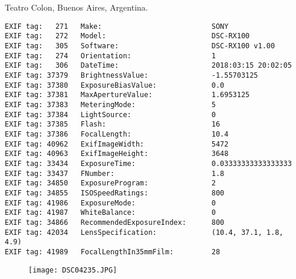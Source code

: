 \section{\protect{}}
\noindent Teatro Colon, Buenos Aires, Argentina.
\noindent
\begin{lstlisting}
EXIF tag:   271   Make:                          SONY
EXIF tag:   272   Model:                         DSC-RX100
EXIF tag:   305   Software:                      DSC-RX100 v1.00
EXIF tag:   274   Orientation:                   1
EXIF tag:   306   DateTime:                      2018:03:15 20:02:05
EXIF tag: 37379   BrightnessValue:               -1.55703125
EXIF tag: 37380   ExposureBiasValue:             0.0
EXIF tag: 37381   MaxApertureValue:              1.6953125
EXIF tag: 37383   MeteringMode:                  5
EXIF tag: 37384   LightSource:                   0
EXIF tag: 37385   Flash:                         16
EXIF tag: 37386   FocalLength:                   10.4
EXIF tag: 40962   ExifImageWidth:                5472
EXIF tag: 40963   ExifImageHeight:               3648
EXIF tag: 33434   ExposureTime:                  0.03333333333333333
EXIF tag: 33437   FNumber:                       1.8
EXIF tag: 34850   ExposureProgram:               2
EXIF tag: 34855   ISOSpeedRatings:               800
EXIF tag: 41986   ExposureMode:                  0
EXIF tag: 41987   WhiteBalance:                  0
EXIF tag: 34866   RecommendedExposureIndex:      800
EXIF tag: 42034   LensSpecification:             (10.4, 37.1, 1.8, 4.9)
EXIF tag: 41989   FocalLengthIn35mmFilm:         28

\end{lstlisting}
\clearpage
\begin{figure}
\raggedleft
\texttt{[image: DSC04235.JPG]}
\end{figure}


\clearpage
